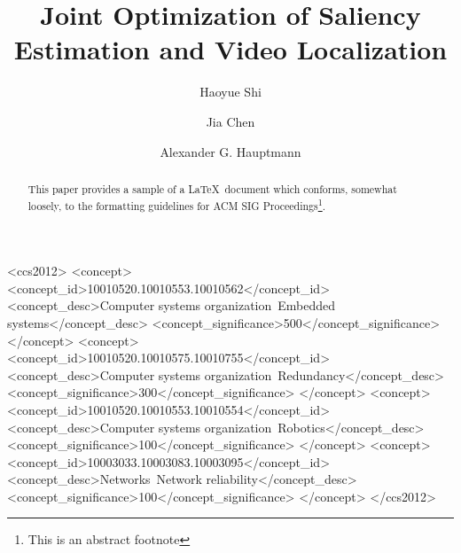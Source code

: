 \documentclass[sigconf, review=true, anonymous=true]{acmart}
\begin{document}
\title{Joint Optimization of Saliency Estimation and Video Localization}

\author{Haoyue Shi}

\author{Jia Chen}

\author{Alexander G. Hauptmann}


\begin{abstract}
This paper provides a sample of a \LaTeX\ document which conforms,
somewhat loosely, to the formatting guidelines for
ACM SIG Proceedings\footnote{This is an abstract footnote}. 
\end{abstract}

\begin{CCSXML}
<ccs2012>
 <concept>
  <concept_id>10010520.10010553.10010562</concept_id>
  <concept_desc>Computer systems organization~Embedded systems</concept_desc>
  <concept_significance>500</concept_significance>
 </concept>
 <concept>
  <concept_id>10010520.10010575.10010755</concept_id>
  <concept_desc>Computer systems organization~Redundancy</concept_desc>
  <concept_significance>300</concept_significance>
 </concept>
 <concept>
  <concept_id>10010520.10010553.10010554</concept_id>
  <concept_desc>Computer systems organization~Robotics</concept_desc>
  <concept_significance>100</concept_significance>
 </concept>
 <concept>
  <concept_id>10003033.10003083.10003095</concept_id>
  <concept_desc>Networks~Network reliability</concept_desc>
  <concept_significance>100</concept_significance>
 </concept>
</ccs2012>  
\end{CCSXML}




\maketitle




 
\end{document}

